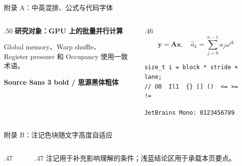 \begin{frame}[fragile]{附录 A：中英混排、公式与代码字体}
\begin{columns}[T,onlytextwidth]
\begin{column}{.50\textwidth}
\textbf{研究对象：GPU 上的批量并行计算}\par\vspace{3mm}
Global memory、Warp shuffle、\\Register pressure 和 Occupancy 使用一致术语。
\par\vspace{4mm}{\itshape Source Sans 3 italic}\par
{\bfseries Source Sans 3 bold / 思源黑体粗体}\par\vspace{4mm}
\end{column}
\begin{column}{.46\textwidth}
\[\mathbf y=\mathbf A\mathbf x,\quad \hat a_k=\sum_{j=0}^{n-1}a_j\omega^{jk}\]
\begin{lstlisting}
size_t i = block * stride + lane;
// O0  Il1  {} [] ()  <= >= !=
\end{lstlisting}
\smalltext\texttt{JetBrains Mono: 0123456789}\par\vspace{3mm}
\end{column}
\end{columns}
\end{frame}

\begin{frame}{附录 B：注记色块随文字高度自适应}
\begin{columns}[T,onlytextwidth]
\begin{column}{.47\textwidth}
\vspace{5mm}
\vspace{5mm}
\end{column}
\begin{column}{.47\textwidth}
\vspace{5mm}
注记用于补充影响理解的条件；浅蓝结论区用于承载本页要点。
\par\vspace{3mm}
\end{column}
\end{columns}
\end{frame}

